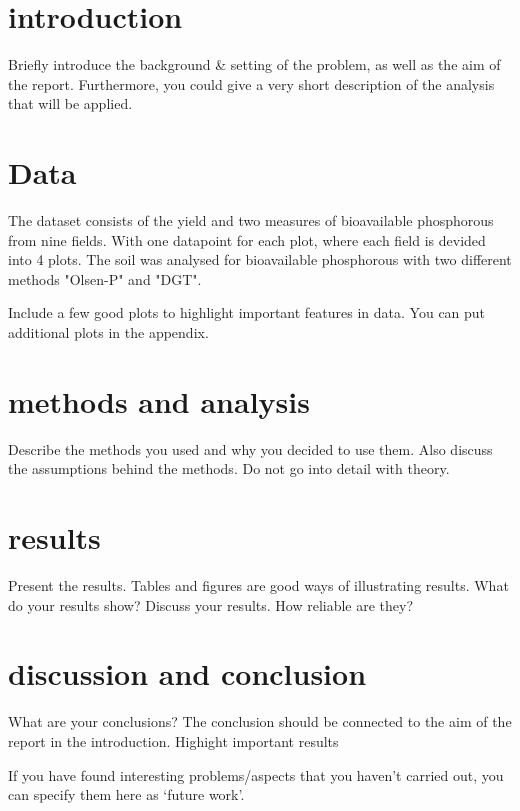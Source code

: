 \section{introduction}
Briefly introduce the background & setting of the problem, as well as the aim of the report.
Furthermore, you could give a very short description of the analysis that will be applied.

\section{Data}
The dataset consists of the yield and two measures of bioavailable phosphorous from nine fields.
With one datapoint for each plot, where each field is devided into 4 plots.
The soil was analysed for bioavailable phosphorous with two different methods "Olsen-P" and "DGT".

Include a few good plots to highlight important features in data. You can put additional plots in the appendix.

\section{methods and analysis}

Describe the methods you used and why you decided to use them. 
Also discuss the assumptions behind the methods. Do not go into detail with theory.

\section{results}

Present the results.
Tables and figures are good ways of illustrating results.
What do your results show?
Discuss your results. How reliable are they?

\section{discussion and conclusion}

What are your conclusions? The conclusion should be connected to the aim of the report in the introduction.
	Highight important results
	
If you have found interesting problems/aspects that you haven’t carried out, you can specify them here as ‘future work’.